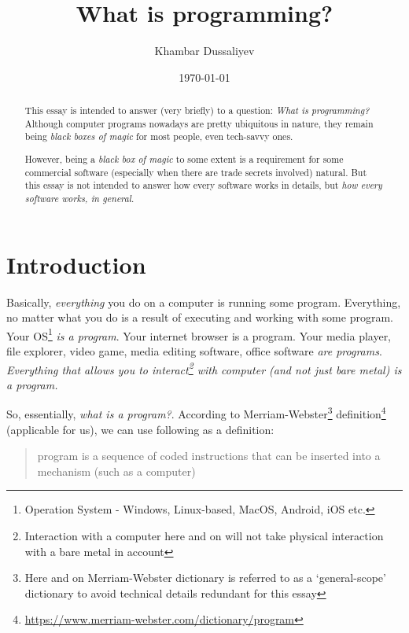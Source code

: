 \documentclass{article}
\title{What is programming?}
\author{Khambar Dussaliyev}
\date{\today}
\begin{document}
    \maketitle
    \begin{abstract}
        This essay is intended to answer (very briefly) to a question: \emph{What is programming?}
        Although computer programs nowadays are pretty ubiquitous in nature, they remain being \emph{black boxes of magic}
        for most people, even tech-savvy ones. \par
        
        However, being a \emph{black box of magic} to some extent is a requirement for some commercial software (especially when there are trade secrets involved) 
        natural. But this essay is not intended to answer how every software works in details, but \emph{how every software works, in general}.
    \end{abstract}
    \newpage

    \tableofcontents
    \newpage

    \section{Introduction}

        Basically, \emph{everything} you do on a computer is running some program. Everything, no matter what you do is a result of executing and working with
        some program. Your OS\footnote{Operation System - Windows, Linux-based, MacOS, Android, iOS etc.} \emph{is a program}. Your internet browser is a program. 
        Your media player, file explorer, video game, media editing software, office software \emph{are programs}. 
        \emph{Everything that allows you to interact\footnote{Interaction with a computer here and on will not take physical interaction with a bare metal in account} 
        with computer (and not just bare metal) is a program.}
        
        So, essentially, \emph{what is a program?}. According to Merriam-Webster\footnote{Here and on Merriam-Webster dictionary is referred to as a `general-scope' dictionary to avoid technical details redundant for this essay} 
        definition\footnote{\href{https://www.merriam-webster.com/dictionary/program}{https://www.merriam-webster.com/dictionary/program}} 
        (applicable for us), we can use following as a definition:
        
        \begin{quote}
            program is a sequence of coded instructions that can be inserted into a mechanism (such as a computer)
        \end{quote}
\end{document}
